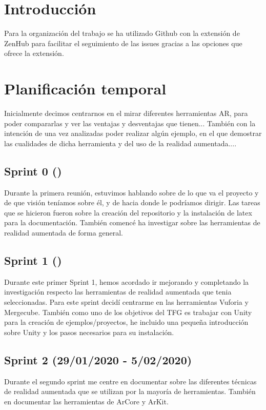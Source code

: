 
\section{Introducción}
 Para la organización del trabajo se ha utilizado Github con la extensión de ZenHub para facilitar el seguimiento de las issues gracias a las opciones que ofrece la extensión.

\section{Planificación temporal}
Inicialmente decimos centrarnos en el mirar diferentes herramientas AR, para poder compararlas y ver las ventajas y desventajas que tienen...
También con la intención de una vez analizadas poder realizar algún ejemplo, en el que demostrar las cualidades de dicha herramienta y del uso de la realidad aumentada....


\subsection{Sprint 0 ()}
Durante la primera reunión, estuvimos hablando sobre de lo que va el proyecto y de que visión teníamos sobre él, y de hacia donde le podríamos dirigir.
Las tareas que se hicieron fueron sobre la creación del repositorio y la instalación de latex para la documentación. También comencé ha investigar sobre las herramientas de realidad aumentada de forma general.

\subsection{Sprint 1 ()}
Durante este primer Sprint 1, hemos acordado ir mejorando y completando  la investigación respecto las herramientas de realidad aumentada que tenia seleccionadas.
Para este sprint decidí centrarme en las herramientas Vuforia y Mergecube.
También como uno de los objetivos del TFG es trabajar con Unity para la creación de ejemplos/proyectos, he incluido una pequeña introducción sobre Unity y los pasos necesarios para su instalación.
\subsection{Sprint 2 (29/01/2020 - 5/02/2020)}
Durante el segundo sprint me centre en documentar sobre las diferentes técnicas de realidad aumentada que se utilizan por la mayoría de herramientas.
También en documentar las herramientas de ArCore y ArKit.

